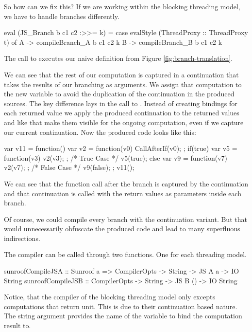 So how can we fix this? If we are working within the blocking 
threading model, we have to handle branches differently.
\begin{Code}
eval (JS_Branch b c1 c2 :>>= k) = 
  case evalStyle (ThreadProxy :: ThreadProxy t) of
    A -> compileBranch_A b c1 c2 k
    B -> compileBranch_B b c1 c2 k
\end{Code}
The call to 
executes our naive definition from Figure \ref{fig:branch-translation}.
We can see that the rest of our computation is captured in a
continuation  that takes the results of our branching
as arguments. We assign that computation to the new variable 
to avoid the duplication of the continuation in the produced sources.
The key difference lays in the call to . Instead
of creating bindings for each returned value we apply the produced
continuation to the returned values and like that make them visible for
the ongoing computation, even if we capture our current continuation. 
Now the produced code looks like this:
\begin{Code}
var v11 = function() {
  var v2 = function(v0) { CallAfterIf(v0); };
  if(true){
    var v5 = function(v3) { v2(v3); };
    /* True Case */
    v5(true);
  } else {
    var v9 = function(v7) { v2(v7); };
    /* False Case */
    v9(false);
  }
};
v11();
\end{Code}
We can see that the function call after the branch is captured by the 
continuation  and that continuation is called with the 
return values as parameters inside each branch.

Of course, we could compile every branch with the 
continuation variant. But that would unnecessarily 
obfuscate the produced code and lead to many superfluous 
indirections.

The compiler can be called through two functions. 
One for each threading model.
\begin{Code}
sunroofCompileJSA :: Sunroof a 
                  => CompilerOpts -> String -> JS A a  -> IO String
sunroofCompileJSB :: CompilerOpts -> String -> JS B () -> IO String
\end{Code}
Notice, that the compiler of the blocking threading model only
excepts computations that return unit. This is due to their 
continuation based nature. The string argument provides 
the name of the variable to bind the computation result to.










